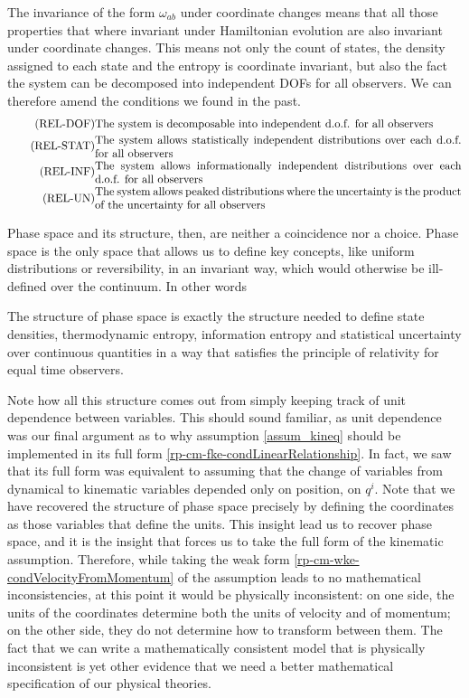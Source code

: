The invariance of the form $\omega_{ab}$ under coordinate changes means that all those properties that where invariant under Hamiltonian evolution are also invariant under coordinate changes. This means not only the count of states, the density assigned to each state and the entropy is coordinate invariant, but also the fact the system can be decomposed into independent DOFs for all observers. We can therefore amend the conditions we found in the past. 
\begin{align}
	\tag{REL-DOF}\label{rp-cm-ir-condIndepDof}
	&\eqtext{The system is decomposable into independent d.o.f. for all observers} \\
	\tag{REL-STAT}\label{rp-cm-ir-condIndepDistr}
	&\eqtext{The system allows statistically independent distributions over each d.o.f. for all observers} \\
	\tag{REL-INF}\label{rp-cm-ir-condIndepEntropy}
	&\eqtext{The system allows informationally independent distributions over each d.o.f. for all observers} \\
	\tag{REL-UN}\label{rp-cm-ir-condIndepUncertainty}
	&\eqtext{The system allows peaked distributions where the uncertainty is the product of the uncertainty for all observers}
\end{align}

Phase space and its structure, then, are neither a coincidence nor a choice. Phase space is the only space that allows us to define key concepts, like uniform distributions or reversibility, in an invariant way, which would otherwise be ill-defined over the continuum. In other words
\begin{insight}
	The structure of phase space is exactly the structure needed to define state densities, thermodynamic entropy, information entropy and statistical uncertainty over continuous quantities in a way that satisfies the principle of relativity for equal time observers.
\end{insight}

Note how all this structure comes out from simply keeping track of unit dependence between variables. This should sound familiar, as unit dependence was our final argument as to why assumption \ref{assum_kineq} should be implemented in its full form \ref{rp-cm-fke-condLinearRelationship}. In fact, we saw that its full form was equivalent to assuming that the change of variables from dynamical to kinematic variables depended only on position, on $q^i$. Note that we have recovered the structure of phase space precisely by defining the coordinates as those variables that define the units. This insight lead us to recover phase space, and it is the insight that forces us to take the full form of the kinematic assumption. Therefore, while taking the weak form \ref{rp-cm-wke-condVelocityFromMomentum} of the assumption leads to no mathematical inconsistencies, at this point it would be physically inconsistent: on one side, the units of the coordinates determine both the units of velocity and of momentum; on the other side, they do not determine how to transform between them. The fact that we can write a mathematically consistent model that is physically inconsistent is yet other evidence that we need a better mathematical specification of our physical theories.

